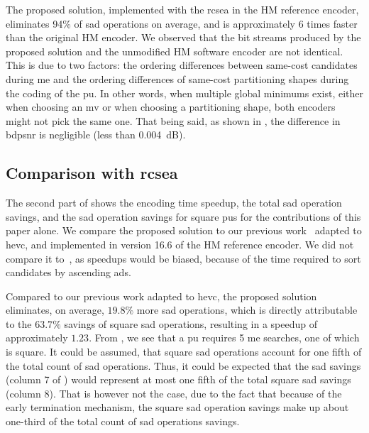 \documentclass{article}
\begin{document}
The proposed solution, implemented with the \gls{rcsea} in the HM reference encoder, eliminates 94\% of \gls{sad} operations on average, and is approximately 6 times faster than the original HM encoder. We observed that the bit streams produced by the proposed solution and the unmodified HM software encoder are not identical. This is due to two factors: the ordering differences between same-cost candidates during \gls{me} and the ordering differences of same-cost partitioning shapes during the coding of the \gls{pu}. In other words, when multiple global minimums exist, either when choosing an \gls{mv} or when choosing a partitioning shape, both encoders might not pick the same one. That being said, as shown in , the difference in \gls{bdpsnr} is negligible (less than 0.004~dB).

\subsection{Comparison with \gls{rcsea}}
\label{sec:vsSEA}
\vspace{-0.5em}
The second part of  shows the encoding time speedup, the total \gls{sad} operation savings, and the \gls{sad} operation savings for square \glspl{pu} for the contributions of this paper alone. We compare the proposed solution to our previous work~\cite{Trud14} adapted to \gls{hevc}, and implemented in version 16.6 of the HM reference encoder. We did not compare it to~\cite{Trud15}, as speedups would be biased, because of the time required to sort candidates by ascending \gls{ads}.

Compared to our previous work adapted to \gls{hevc}, the proposed solution eliminates, on average, $19.8\%$ more \gls{sad} operations, which is directly attributable to the $63.7\%$ savings of square \gls{sad} operations, resulting in a speedup of approximately $1.23$. From , we see that a \gls{pu} requires 5 \gls{me} searches, one of which is square. It could be assumed, that square \gls{sad} operations account for one fifth of the total count of \gls{sad} operations. Thus, it could be expected that the \gls{sad} savings (column 7  of ) would represent at most one fifth of the total square \gls{sad} savings (column 8). That is however not the case, due to the fact that because of the early termination mechanism, the square \gls{sad} operation savings make up about one-third of the total count of \gls{sad} operations savings. 
\end{document}
